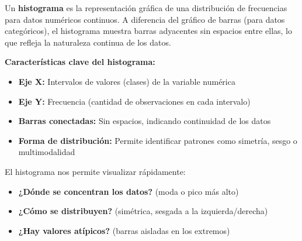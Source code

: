 \documentclass[
  spanish,
  letterpaper,
  DIV=11,
  numbers=noendperiod]{scrreprt}
\providecommand{\tightlist}{%
  \setlength{\itemsep}{0pt}\setlength{\parskip}{0pt}}
\begin{document}
Un \textbf{histograma} es la representación gráfica de una distribución
de frecuencias para datos numéricos continuos. A diferencia del gráfico
de barras (para datos categóricos), el histograma muestra barras
adyacentes sin espacios entre ellas, lo que refleja la naturaleza
continua de los datos.

\textbf{Características clave del histograma:}

\begin{itemize}
\tightlist
\item
  \textbf{Eje X:} Intervalos de valores (clases) de la variable numérica
\item
  \textbf{Eje Y:} Frecuencia (cantidad de observaciones en cada
  intervalo)
\item
  \textbf{Barras conectadas:} Sin espacios, indicando continuidad de los
  datos
\item
  \textbf{Forma de distribución:} Permite identificar patrones como
  simetría, sesgo o multimodalidad
\end{itemize}

El histograma nos permite visualizar rápidamente:

\begin{itemize}
\tightlist
\item
  \textbf{¿Dónde se concentran los datos?} (moda o pico más alto)
\item
  \textbf{¿Cómo se distribuyen?} (simétrica, sesgada a la
  izquierda/derecha)
\item
  \textbf{¿Hay valores atípicos?} (barras aisladas en los extremos)
\end{itemize}
\end{document}
